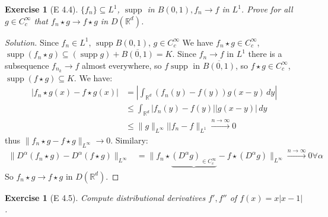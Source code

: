 \documentclass{report}
\theoremstyle{tommy}
\newtheorem{ex}[defn]{Exercise}
\newcommand{\supp}{\operatorname{supp}}
\begin{document}
  \begin{ex}[E 4.4]
    \(\{f_n\} \subseteq L^1\), \(\supp\) in \(B(0,1), f_n \to f\) in \(L^1\). Prove for all \(g \in C_c^\infty\) that \(f_n \star g \to f \star g\) in \(D(\mathbb{R}^d)\).
  \end{ex}

  \begin{proof}[Solution]
    Since \(f_n \in L^1\), \(\supp B(0,1)\), \(g \in C_c^\infty\) We have \(f_n \star g \in C_c^\infty\), \(\supp(f_n \star g) \subseteq (\supp g) + \overline{B(0,1)} = K\). Since \(f_n \to f\) in \(L^1\) there is a subsequence \(f_{n_k} \to f\) almost everywhere, so \(f \supp\) in \(\overline{B(0,1)}\), so \(f \star g \in C_c^\infty\), \(\supp(f \star g) \subseteq K\). We have:
    \begin{align*}
      |f_n \star g(x) - f \star g(x)| 
      &= \left|\int_{\mathbb{R}^d} (f_n(y)-f(y))g(x-y) \, dy \right| \\
      &\le \int_{\mathbb{R}^d} |f_n(y) - f(y)| |g(x-y)| \, dy \\
      &\le \|g\|_{L^\infty} ||f_n - f\|_{L^1} 
      \xrightarrow{n \to \infty} 0
    \end{align*}
    thus \(\|f_n \star g - f \star g\|_{L^\infty} \to 0\). Similary:
    \begin{align*}
      \|D^\alpha(f_n \star g) - D^\alpha (f\star g)\|_{L^\infty} 
      &= \|f_n \star \underbrace{(D^\alpha g)_{\in C_c^\infty}} - f \star (D^\alpha g)\|_{L^\infty} \xrightarrow{n \to \infty} 0  \forall \alpha
    \end{align*}
    So \(f_n \star g \to f \star g\) in \(D(\mathbb{R}^d)\).
  \end{proof}

  \begin{ex}[E 4.5]
    Compute distributional derivatives \(f', f''\) of \(f(x) = x|x-1|\).
  \end{ex}
\end{document}
